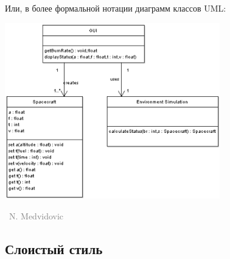 \documentclass[a5paper]{article}
\newcommand{\attribution}[1] {
    \vspace{-4mm}\begin{flushright}\begin{scriptsize}\textcolor{gray}
    {\textcopyright\, #1}\end{scriptsize}\end{flushright}
}
\begin{document}
Или, в более формальной нотации диаграмм классов UML:

\begin{center}
    \includegraphics[width=0.7\textwidth]{objectOrientedLLUML.png}
    \attribution{N. Medvidovic}
\end{center}

\subsection{Слоистый стиль}
\end{document}
